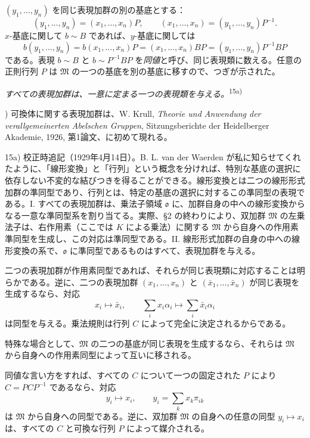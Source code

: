 \documentclass[11pt]{article}
\providecommand{\mM}{\mathfrak{M}}
\providecommand{\mo}{\mathfrak{o}}
\begin{document}
$(y_1,\ldots,y_n)$ を同じ表現加群の別の基底とする：
\[
        (y_1,\ldots,y_n)=(x_1,\ldots,x_n)P,
        \qquad
        (x_1,\ldots,x_n)=(y_1,\ldots,y_n)P^{-1}.
\]
$x$-基底に関して $b\sim B$ であれば、$y$-基底に関しては
\[
        b(y_1,\ldots,y_n)
        =b(x_1,\ldots,x_n)P
        =(x_1,\ldots,x_n)BP
        =(y_1,\ldots,y_n)P^{-1}BP
\]
である。表現 $b\sim B$ と $b\sim P^{-1}BP$ を\emph{同値}と呼び、同じ表現類に数える。任意の正則行列 $P$ は $\mM$ の一つの基底を別の基底に移すので、つぎが示された。

\emph{すべての表現加群は、一意に定まる一つの表現類を与える。}\textsuperscript{15a)}

{\footnotesize{}) 可換体に関する表現加群は、W. Krull, \emph{Theorie und Anwendung der verallgemeinerten Abelschen Gruppen}, Sitzungsberichte der Heidelberger Akademie, 1926, 第1論文、に初めて現れる。\par
15a) 校正時追記（1929年4月14日）。B. L. van der Waerden が私に知らせてくれたように、「線形変換」と「行列」という概念を分ければ、特別な基底の選択に依存しない不変的な結びつきを得ることができる。線形変換とは二つの線形形式加群の準同型であり、行列とは、特定の基底の選択に対するこの準同型の表現である。I. すべての表現加群は、乗法子領域 $\mo$ に、加群自身の中への線形変換からなる一意な準同型系を割り当てる。実際、§2 の終わりにより、双加群 $\mM$ の左乗法子は、右作用素（ここでは $K$ による乗法）に関する $\mM$ から自身への作用素準同型を生成し、この対応は準同型である。II. 線形形式加群の自身の中への線形変換の系で、$\mo$ に準同型であるものはすべて、表現加群を与える。\par}

二つの表現加群が作用素同型であれば、それらが同じ表現類に対応することは明らかである。逆に、二つの表現加群 $(x_1,\ldots,x_n)$ と $(\bar x_1,\ldots,\bar x_n)$ が同じ表現を生成するなら、対応
\[
        x_i\mapsto \bar x_i,
        \qquad
        \sum_i x_i\alpha_i\mapsto \sum_i \bar x_i\alpha_i
\]
は同型を与える。乗法規則は行列 $C$ によって完全に決定されるからである。

特殊な場合として、$\mM$ の二つの基底が同じ表現を生成するなら、それらは $\mM$ から自身への作用素同型によって互いに移される。

同値な言い方をすれば、すべての $C$ について一つの固定された $P$ により $C=PCP^{-1}$ であるなら、対応
\[
        y_i\mapsto x_i,
        \qquad
        y_i=\sum_k x_k\pi_{ik}
\]
は $\mM$ から自身への同型である。逆に、双加群 $\mM$ の自身への任意の同型 $y_i\mapsto x_i$ は、すべての $C$ と可換な行列 $P$ によって媒介される。
\end{document}
